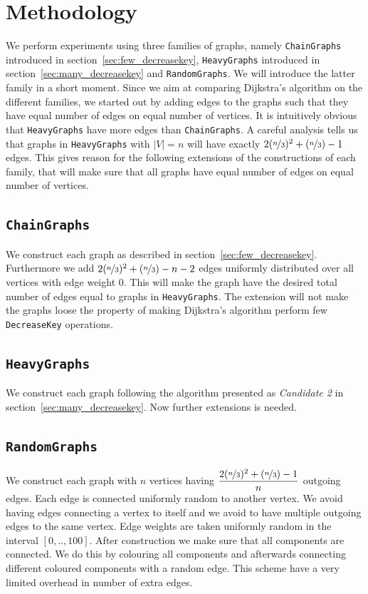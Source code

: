 \documentclass[a4paper,oneside,article,11pt]{memoir}
\begin{document}
\section{Methodology}
\label{sec:dijkstra_methology}
We perform experiments using three families of graphs, namely \texttt{ChainGraphs} introduced in section~\ref{sec:few_decreasekey}, \texttt{HeavyGraphs} introduced in section~\ref{sec:many_decreasekey} and \texttt{RandomGraphs}. We will introduce the latter family in a short moment. Since we aim at comparing Dijkstra's algorithm on the different families, we started out by adding edges to the graphs such that they have equal number of edges on equal number of vertices. It is intuitively obvious that \texttt{HeavyGraphs} have more edges than \texttt{ChainGraphs}. A careful analysis tells us that graphs in \texttt{HeavyGraphs} with $\lvert V \rvert = n$ will have exactly $2(\nicefrac{n}{3})^2 + (\nicefrac{n}{3})-1$ edges. This gives reason for the following extensions of the constructions of each family, that will make sure that all graphs have equal number of edges on equal number of vertices.

\subsection{\texttt{ChainGraphs}}
We construct each graph as described in section~\ref{sec:few_decreasekey}. Furthermore we add $2(\nicefrac{n}{3})^2 + (\nicefrac{n}{3})- n - 2$ edges uniformly distributed over all vertices with edge weight $0$. This will make the graph have the desired total number of edges equal to graphs in \texttt{HeavyGraphs}. The extension will not make the graphs loose the property of making Dijkstra's algorithm perform few \texttt{DecreaseKey} operations.

\subsection{\texttt{HeavyGraphs}}
We construct each graph following the algorithm presented as \textit{Candidate 2} in section~\ref{sec:many_decreasekey}. Now further extensions is needed.

\subsection{\texttt{RandomGraphs}}
We construct each graph with $n$ vertices having $\dfrac{2(\nicefrac{n}{3})^2 + (\nicefrac{n}{3})-1}{n}$ outgoing edges. Each edge is connected uniformly random to another vertex. We avoid having edges connecting a vertex to itself and we avoid to have multiple outgoing edges to the same vertex. Edge weights are taken uniformly random in the interval $[0, .., 100]$. After construction we make sure that all components are connected. We do this by colouring all components and afterwards connecting different coloured components with a random edge. This scheme have a very limited overhead in number of extra edges.
\end{document}
